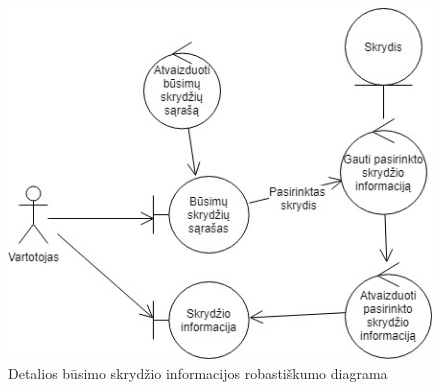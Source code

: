 \documentclass{VUMIFPSkursinis}
\begin{document}
\begin{enumerate}[label=\textbf{U\arabic*}.]
                    \begin{figure}[H]
                        \centering
                        \includegraphics[scale=0.8]{img/ROBupcoming-flight-info}
                        \caption{Detalios būsimo skrydžio informacijos robastiškumo diagrama}
                        \label{home_page_one_way}
                    \end{figure}
                    
                \end{enumerate}
      
\end{document}
